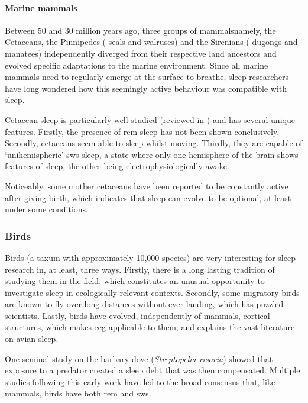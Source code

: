 \paragraph*{Marine mammals}
Between 50 and 30 million years ago, three groups of 
mammals\emd{}namely, the Cetaceans, the Pinnipedes (\eg{} seals and walruses) and the Sirenians (\ie{} dugongs and manatees)\emd{}
independently diverged from their respective land ancestors and evolved specific adaptations to the marine environment\cite{berta_marine_2005}.
Since all marine mammals need to regularly emerge at the surface to breathe, 
sleep researchers have long wondered how this seemingly active behaviour was compatible with sleep\cite{lilly_animals_1964}.

Cetacean sleep is particularly well studied (reviewed in \cite{lyamin_cetacean_2008}) and has several unique features.
Firstly, the presence of \gls{rem} sleep has not been shown conclusively\cite{mukhametov_black_1997,lyamin_cetacean_2008}.
Secondly, cetaceans seem able to sleep whilst moving\cite{sekiguchi_sleep_2006}.
Thirdly, they  are capable of `unihemispheric' \gls{sws} sleep, a state where only one hemisphere of the brain shows features of sleep, the other being electrophysiologically awake\cite{lyamin_relationship_2004}.


Noticeably, some mother cetaceans have been reported to be constantly active after giving  birth\cite{lyamin_animal_2005}, which indicates that sleep can evolve to be optional, at least under some conditions.

\subsubsection{Birds}

Birds (a taxum with approximately 10,000 species) are very interesting for sleep research in, at least, three ways.
Firstly, there is a long lasting tradition of studying them in the field, which constitutes an unusual opportunity to investigate sleep in ecologically relevant contexts.
Secondly, some migratory birds are known to fly over long distances without ever landing, which has puzzled scientists.
Lastly, birds have evolved, independently of mammals, cortical structures, which makes \gls{eeg}
applicable to them, and explains the vast literature on avian sleep\cite{rattenborg_avian_2009}.

One seminal study on the barbary dove (\emph{Streptopelia risoria}) showed that exposure to a predator created a sleep debt that was then
compensated\cite{lendrem_sleeping_1984}. 
Multiple studies following this early work have led to the broad consensus that,
like mammals, birds have both \gls{rem} and \gls{sws}\cite{rattenborg_avian_2009}.

